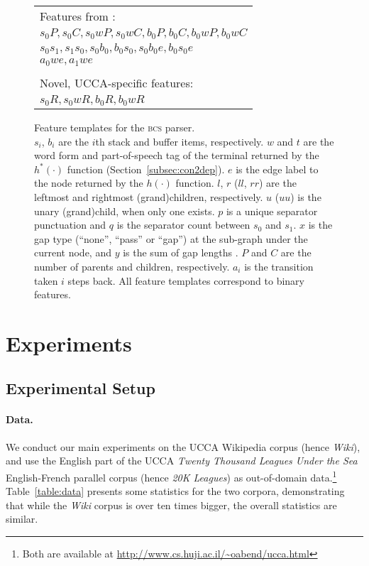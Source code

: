 \documentclass[11pt]{article}
\newcommand{\secref}[1]{Section~\ref{#1}}
\newcommand{\tabref}[1]{Table~\ref{#1}}
\begin{document}
\begin{figure}
\begin{tabular}{>{\small}l}
\\
{\footnotesize Features from \cite{tokgoz2015transition}:} \\
$s_0P, s_0C, s_0wP, s_0wC, b_0P, b_0C, b_0wP, b_0wC$ \\
$s_0s_1, s_1s_0, s_0b_0, b_0s_0, s_0b_0e, b_0s_0e$ \\
$a_0we, a_1we$ \\
\\
{\footnotesize Novel, UCCA-specific features:} \\
$s_0R, s_0wR, b_0R, b_0wR$
\end{tabular}
\caption{Feature templates for the \textsc{bcs} parser.\label{fig:features}\\
\footnotesize
$s_i$, $b_i$ are the $i$th stack and buffer items, respectively.
$w$ and $t$ are the word form and part-of-speech tag of the terminal returned by the $h^*(\cdot)$ function (\secref{subsec:con2dep}).
$e$ is the edge label to the node returned by the $h(\cdot)$ function.
$l$, $r$ ($ll$, $rr$) are the leftmost and rightmost (grand)children, respectively.
$u$ ($uu$) is the unary (grand)child, when only one exists.
$p$ is a unique separator punctuation and $q$ is the separator count between $s_0$ and $s_1$.
$x$ is the gap type (``none'', ``pass'' or ``gap'') at the sub-graph under the current node, and $y$ is the sum of gap lengths \protect\cite{maier2009characterizing}.
$P$ and $C$ are the number of parents and children, respectively.
$a_i$ is the transition taken $i$ steps back.
All feature templates correspond to binary features.
}
\end{figure}


\section{Experiments}\label{sec:experiments}

\subsection{Experimental Setup}

\paragraph{Data.}\label{sec:data}
We conduct our main experiments on the UCCA Wikipedia corpus (hence \textit{Wiki}), and use
the English part of the
UCCA \textit{Twenty Thousand Leagues Under the Sea} English-French parallel corpus (hence \textit{20K Leagues}) as
out-of-domain data.\footnote{Both are available at \url{http://www.cs.huji.ac.il/~oabend/ucca.html}}
\tabref{table:data} presents some statistics for the two corpora, demonstrating that while
the \textit{Wiki} corpus is over ten times bigger, the overall statistics are
similar.
\end{document}
